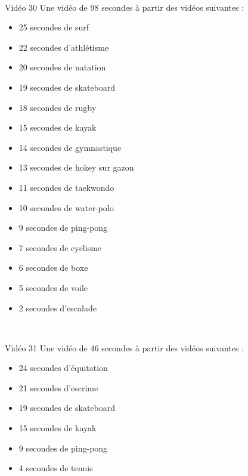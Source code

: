 \documentclass[10pt, a5paper,twoside]{article}
\begin{document}
\vfill

\clearpage
~
\vfill

\begin{card}[width = \textwidth, colback = olympicyellow, colframe = olympicyellow, bottomtitle = 2mm]{Vidéo 30}
  Une vidéo de 98 secondes à partir des vidéos suivantes :
  \vspace{-1mm}\begin{itemize}
    \item 25 secondes de surf
    \item 22 secondes d'athlétisme
    \item 20 secondes de natation
    \item 19 secondes de skateboard
    \item 18 secondes de rugby
    \item 15 secondes de kayak
    \item 14 secondes de gymnastique
    \item 13 secondes de hokey sur gazon
    \item 11 secondes de taekwondo
    \item 10 secondes de water-polo
    \item 9 secondes de ping-pong
    \item 7 secondes de cyclisme
    \item 6 secondes de boxe
    \item 5 secondes de voile
    \item 2 secondes d'escalade
  \end{itemize}
\end{card}

\vfill

\clearpage
~
\vfill

\begin{card}[width = \textwidth, colback = olympicviolet, colframe = olympicviolet, bottomtitle = 2mm]{Vidéo 31}
  Une vidéo de 46 secondes à partir des vidéos suivantes :
  \vspace{-1mm}\begin{itemize}
    \item 24 secondes d'équitation
    \item 21 secondes d'escrime
    \item 19 secondes de skateboard
    \item 15 secondes de kayak
    \item 9 secondes de ping-pong
    \item 4 secondes de tennis
  \end{itemize}
\end{card}
\end{document}
